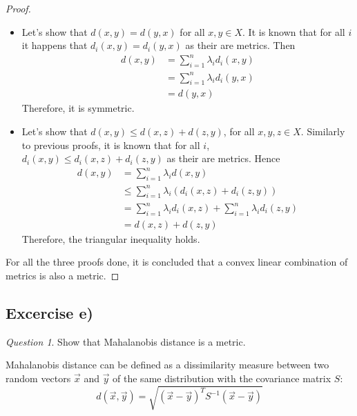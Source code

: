 \documentclass[11pt]{article}
\theoremstyle{definition}
\theoremstyle{remark}
\theoremstyle{remark}
\theoremstyle{remark}
\newtheorem*{question}{Question}
\begin{document}
\begin{proof}
\begin{itemize}
    \item Let's show that $d(x,y) = d(y, x)$ for all $x, y \in X$. It is known
      that for all $i$ it happens that $d_{i}(x,y) = d_{i}(y,x)$ as their are
      metrics. Then
      \begin{align*}
        d(x,y) &= \sum_{i=1}^{n} \lambda_{i}d_{i}(x, y) \\
               &= \sum_{i=1}^{n} \lambda_{i}d_{i}(y, x) \\
               &= d(y, x)
      \end{align*}
      Therefore, it is symmetric.

    \item Let's show that $d(x,y) \le d(x, z) + d(z, y)$, for all
      $x, y, z \in X$. Similarly to previous proofs, it is known that for all
      $i$, $d_{i}(x,y) \le d_{i}(x,z) + d_{i}(z, y)$ as their are metrics. Hence
      \begin{align*}
        d(x,y) &= \sum_{i=1}^{n}\lambda_{i}d(x,y) \\
               &\le \sum_{i=1}^{n}\lambda_{i}\left(d_{i}(x,z) + d_{i}(z, y)\right) \\
               &= \sum_{i=1}^{n} \lambda_{i}d_{i}(x,z) + \sum_{i=1}^{n}\lambda_{i}d_{i}(z,y) \\
               &= d(x, z) + d(z, y)
      \end{align*}
      Therefore, the triangular inequality holds.
  \end{itemize}

  For all the three proofs done, it is concluded that a convex linear
  combination of metrics is also a metric.
\end{proof}

\subsection*{Excercise e)}

\begin{question}
  Show that Mahalanobis distance is a metric.
\end{question}

Mahalanobis distance can be defined as a dissimilarity measure between two
random vectors $\vec{x}$ and $\vec{y}$ of the same distribution with the
covariance matrix $S$:
\[
  d(\vec{x},\vec{y}) = \sqrt{(\vec{x} - \vec{y})^{T}S^{-1}(\vec{x}-\vec{y})}
\]
\end{document}
